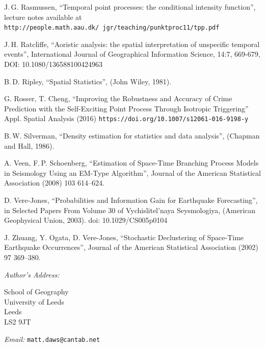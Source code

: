 \documentclass[twoside,a4paper]{article}
\theoremstyle{plain}
\theoremstyle{definition}
\begin{document}
\begin{thebibliography}{99}
 J.\,G. Rasmussen,
	``Temporal point processes: the conditional intensity function'',
	lecture notes available at \texttt{http://people.math.aau.dk/~jgr/teaching/punktproc11/tpp.pdf}

 J.\,H. Ratcliffe, ``Aoristic analysis: the spatial interpretation of unspecific
temporal events'', International Journal of Geographical Information Science, 14:7, 669-679, DOI:
10.1080/136588100424963

 B.\,D. Ripley,
	``Spatial Statistics'',
	(John Wiley, 1981).

 G. Rosser, T. Cheng, ``Improving the Robustness and Accuracy of Crime
	Prediction with the Self-Exciting Point Process Through Isotropic Triggering''
	Appl. Spatial Analysis (2016) \texttt{https://doi.org/10.1007/s12061-016-9198-y}

 B.\,W. Silverman,
	``Density estimation for statistics and data analysis'',
	(Chapman and Hall, 1986).

 A. Veen, F.\,P. Schoenberg,
	``Estimation of Space-Time Branching Process Models in Seismology Using an EM-Type Algorithm'',
	Journal of the American Statistical Association (2008) 103 614--624.

 D. Vere-Jones,
	``Probabilities and Information Gain for Earthquake Forecasting'',
	in Selected Papers From Volume 30 of Vychislitel'naya Seysmologiya,
	(American Geophysical Union, 2003).  doi: 10.1029/CS005p0104

 J. Zhuang, Y. Ogata, D. Vere-Jones,
	``Stochastic Declustering of Space-Time Earthquake Occurrences'',
	Journal of the American Statistical Association (2002) 97 369--380.

\end{thebibliography}


\vspace{5ex}

\noindent\emph{Author's Address:}
\parbox[t]{3in}{School of Geography\\
University of Leeds\\
Leeds\\
LS2 9JT}

\bigskip\noindent\emph{Email:} \texttt{matt.daws@cantab.net}
\end{document}
